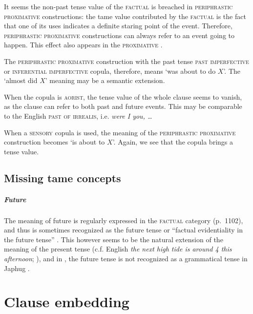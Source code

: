 \documentclass[a4paper, oneside, 12pt]{report}
\newcommand*{\citepage}[1]{p.~{#1}}
\newcommand{\form}[1]{\emph{#1}}
\newcommand{\category}[1]{\textsc{#1}}
\newcommand{\translate}[1]{`#1'}
\begin{document}
It seems the non-past tense value of the \category{factual} is breached in
\category{periphrastic proximative} constructions:
the \ac{tame} value contributed by the \category{factual}
is the fact that one of its uses indicates a definite staring point of the event.
Therefore, \category{periphrastic proximative} constructions
can always refer to an event going to happen.
This effect also appears in the \category{proximative} 
.

The \category{periphrastic proximative} construction
with the past tense \category{past imperfective} or \category{inferential imperfective} copula,
therefore, means \translate{was about to do $X$}.
The \translate{almost did $X$} meaning may be a semantic extension.

When the copula is \category{aorist},
the tense value of the whole clause seems to vanish,
as the clause can refer to both past and future events.
This may be comparable to the English \category{past of irrealis},
i.e. \form{were I you, \dots}

When a \category{sensory} copula is used,
the meaning of the \category{periphrastic proximative} construction 
becomes \translate{is about to $X$}.
Again, we see that the copula brings a tense value.

\section{Missing \ac{tame} concepts}
\label{sec:tame.missing}

\paragraph*{Future}
The meaning of future
is regularly expressed in the \category{factual} category (\citepage{1102}),
and thus is sometimes recognized as the future tense 
or ``factual evidentiality in the future tense'' 
\citep[\citepage{518}]{jacques2019egophoric}.
This however seems to be the natural extension of the meaning 
of the present tense 
(c.f. English \form{the next high tide is around 4 this afternoon}; 
\citealt[\citepage{131}, {[20]}]{cgel}),
and in \citet{jacques2021grammar}, 
the future tense is not recognized as a grammatical tense in Japhug
\citep[\citepage{1102}, (46)]{jacques2021grammar}.

\chapter{Clause embedding}
\end{document}
